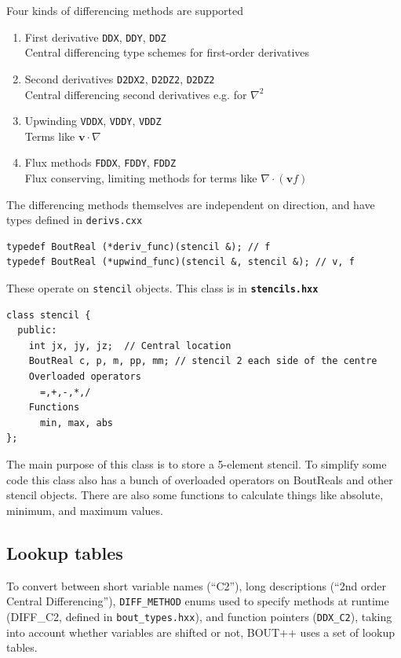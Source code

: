 \documentclass[12pt]{article}
\newcommand{\code}[1]{\texttt{#1}}
\newcommand{\file}[1]{\texttt{\bf #1}}
\begin{document}
Four kinds of differencing methods are supported
\begin{enumerate}
\item First derivative \code{DDX}, \code{DDY}, \code{DDZ} \\
  Central differencing type schemes for first-order derivatives
\item Second derivatives \code{D2DX2}, \code{D2DZ2}, \code{D2DZ2} \\
  Central differencing second derivatives e.g. for $\nabla^2$
\item Upwinding \code{VDDX}, \code{VDDY}, \code{VDDZ} \\
   Terms like $\mathbf{v}\cdot\nabla$
\item Flux methods \code{FDDX}, \code{FDDY}, \code{FDDZ} \\
  Flux conserving, limiting methods for terms like $\nabla\cdot\left(\mathbf{v}f\right)$
\end{enumerate}

The differencing methods themselves are independent on direction, and have
types defined in \texttt{derivs.cxx}
\begin{lstlisting}
typedef BoutReal (*deriv_func)(stencil &); // f
typedef BoutReal (*upwind_func)(stencil &, stencil &); // v, f
\end{lstlisting}
These operate on \code{stencil} objects. This class is in \file{stencils.hxx}
\begin{lstlisting}
class stencil {
  public:
    int jx, jy, jz;  // Central location
    BoutReal c, p, m, pp, mm; // stencil 2 each side of the centre
    Overloaded operators
      =,+,-,*,/
    Functions
      min, max, abs
};
\end{lstlisting}
The main purpose of this class is to store a 5-element stencil. To simplify some code
this class also has a bunch of overloaded operators on BoutReals and other stencil objects. 
There are also some functions to calculate things like absolute, minimum, and maximum
values.

\subsection{Lookup tables}

To convert between short variable names (``C2''), long descriptions 
(``2nd order Central Differencing''), \texttt{DIFF\_METHOD} enums used to specify methods
at runtime (DIFF\_C2, defined in \texttt{bout\_types.hxx}), and function pointers
(\texttt{DDX\_C2}), taking into account whether
variables are shifted or not, BOUT++ uses a set of lookup tables.
\end{document}
